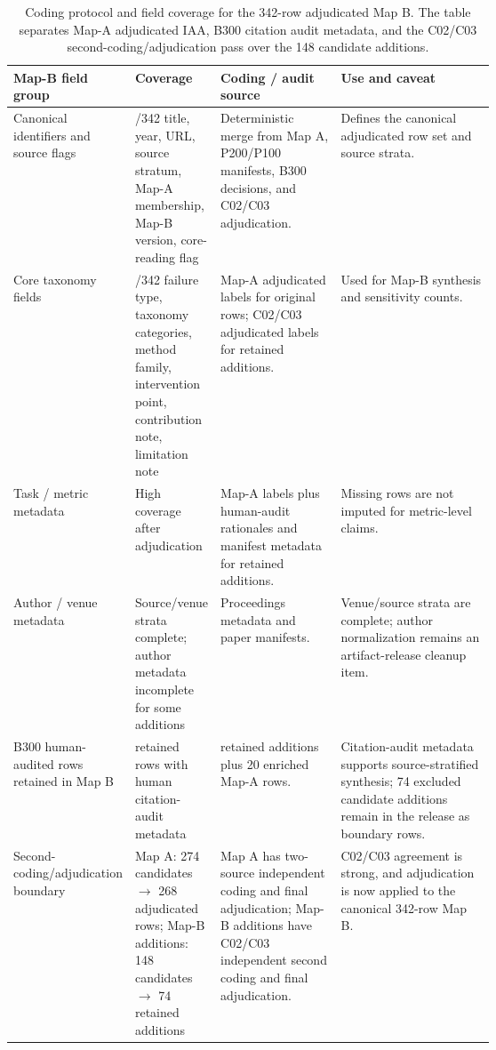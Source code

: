\documentclass[11pt]{article}
\begin{document}
\begin{table}[t]
\centering
\scriptsize
\renewcommand{\arraystretch}{0.9}
\begin{tabularx}{\linewidth}{>{\raggedright\arraybackslash}p{0.22\linewidth}>{\raggedright\arraybackslash}p{0.16\linewidth}>{\raggedright\arraybackslash}p{0.25\linewidth}X}
\toprule
\textbf{Map-B field group} & \textbf{Coverage} & \textbf{Coding / audit source} & \textbf{Use and caveat} \\
\midrule
Canonical identifiers and source flags & 342/342 title, year, URL, source stratum, Map-A membership, Map-B version, core-reading flag & Deterministic merge from Map A, P200/P100 manifests, B300 decisions, and C02/C03 adjudication. & Defines the canonical adjudicated row set and source strata. \\
Core taxonomy fields & 342/342 failure type, taxonomy categories, method family, intervention point, contribution note, limitation note & Map-A adjudicated labels for original rows; C02/C03 adjudicated labels for retained additions. & Used for Map-B synthesis and sensitivity counts. \\
Task / metric metadata & High coverage after adjudication & Map-A labels plus human-audit rationales and manifest metadata for retained additions. & Missing rows are not imputed for metric-level claims. \\
Author / venue metadata & Source/venue strata complete; author metadata incomplete for some additions & Proceedings metadata and paper manifests. & Venue/source strata are complete; author normalization remains an artifact-release cleanup item. \\
B300 human-audited rows retained in Map B & 94 retained rows with human citation-audit metadata & 74 retained additions plus 20 enriched Map-A rows. & Citation-audit metadata supports source-stratified synthesis; 74 excluded candidate additions remain in the release as boundary rows. \\
Second-coding/adjudication boundary & Map A: 274 candidates $\rightarrow$ 268 adjudicated rows; Map-B additions: 148 candidates $\rightarrow$ 74 retained additions & Map A has two-source independent coding and final adjudication; Map-B additions have C02/C03 independent second coding and final adjudication. & C02/C03 agreement is strong, and adjudication is now applied to the canonical 342-row Map B. \\
\bottomrule
\end{tabularx}
\caption{Coding protocol and field coverage for the 342-row adjudicated Map B. The table separates Map-A adjudicated IAA, B300 citation audit metadata, and the C02/C03 second-coding/adjudication pass over the 148 candidate additions.}
\label{tab:map-b-coding-coverage}
\end{table}
\end{document}
